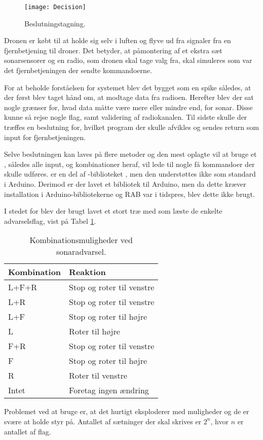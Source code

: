 \documentclass[Main]{subfiles}
\begin{document}
\begin{wrapfigure}{r}{0.32\textwidth}
  \vspace{-20pt}
  \begin{center}
	\texttt{[image: Decision]}
  \end{center}
  \vspace{-20pt}
  \caption{Beslutningstagning.}
  \label{Fig:Decision}
  \vspace{-30pt}
\end{wrapfigure}

Dronen er købt til at holde sig selv i luften og flyve ud fra signaler fra en fjernbetjening til droner.
Det betyder, at påmontering af et ekstra sæt sonarsensorer og en radio, som dronen skal tage valg fra, skal simuleres som var det fjernbetjeningen der sendte kommandoerne.

For at beholde forståelsen for systemet blev det bygget som en spike således, at der først blev taget hånd om, at modtage data fra radioen.
Herefter blev der sat nogle grænser for, hvad data måtte være mere eller mindre end, for sonar. Disse kunne så rejse nogle flag, samt validering af radiokanalen.
Til sidste skulle der træffes en beslutning for, hvilket program der skulle afvikles og sendes return som input for fjernbetjeningen.

Selve beslutningen kan laves på flere metoder og den mest oplagte vil at bruge et , således alle input, og kombinationer heraf, vil lede til nogle få kommandoer der skulle udføres.
 er en del af -biblioteket \cite{stl}, men den understøttes ikke som standard i Arduino.
Derimod er der lavet et bibliotek til Arduino\cite{Arduino-stl}, men da dette kræver installation i Arduino-bibliotekerne og RAB var i tidspres, blev dette ikke brugt.

I stedet for  blev der brugt lavet et stort træ med  som læste de enkelte advarselsflag, vist på Tabel \ref{Tab:SonarAdvarsel}.

\begin{table}[H]
\centering
	\begin{tabular}{l l}
	\hline Kombination & Reaktion
	\\ \hline 
	L+F+R & Stop og roter til venstre \\
	L+R & Stop og roter til venstre\\
	L+F & Stop og roter til højre\\
	L & Roter til højre\\
	F+R & Stop og roter til venstre\\
	F & Stop og roter til højre\\
	R & Roter til venstre\\
	Intet & Foretag ingen ændring \\ \hline
	\end{tabular}
\caption{Kombinationsmuligheder ved sonaradvarsel.}
\label{Tab:SonarAdvarsel}
\end{table}

Problemet ved at bruge  er, at det hurtigt eksploderer med muligheder og de er svære at holde styr på.
Antallet af sætninger der skal skrives er $2^n$, hvor $n$ er antallet af flag.
\end{document}
